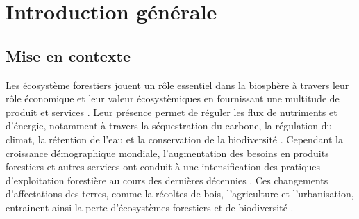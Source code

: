\chapter*{Introduction générale}         %
\label{chap-introduction}       %


\section*{Mise en contexte}
\label{sec:contexte}

Les écosystème forestiers jouent un rôle essentiel dans la biosphère à travers leur rôle économique et leur valeur écosystèmiques en fournissant une multitude de produit et services \citep{Balvanera2006Quantifyingevidence}. 
Leur présence permet de réguler les flux de nutriments et d'énergie, notamment à travers la séquestration du carbone, la régulation du climat, la rétention de l'eau et la conservation de la biodiversité \citep{Balvanera2006Quantifyingevidence,Diaz2006BiodiversityLoss,Canadell2008Managingforests,Pawson2013Plantationforests}. 
Cependant la croissance démographique mondiale, l'augmentation des besoins en produits forestiers et autres services ont conduit à une intensification des pratiques d'exploitation forestière au cours des dernières décennies \citep{Foley2005GlobalConsequences}. 
Ces changements d'affectations des terres, comme la récoltes de bois, l'agriculture et l'urbanisation, entrainent ainsi la perte d'écosystèmes forestiers et de biodiversité \citep{Bengtsson2000Biodiversitydisturbances,Sala2000Globalbiodiversity,Naeem2012functionsbiological,Bichet2016Maintaininganimal}. 

